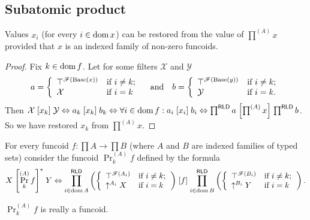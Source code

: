 \subsection{Subatomic product}
\begin{prop}
Values $x_{i}$ (for every $i\in\operatorname{dom} x$) can be restored from the
value of $\prod^{(A)}x$ provided that $x$ is an indexed family of
non-zero funcoids.\end{prop}
\begin{proof}
Fix $k\in\operatorname{dom} f$. Let for some filters $\mathcal{X}$ and $\mathcal{Y}$ 
\[
a=\left\{ \begin{array}{ll}
\top^{\mathscr{F}(\operatorname{Base}(x))} & \text{if }i\neq k;\\
\mathcal{X} & \text{if }i=k
\end{array}\right.\quad\text{and}\quad b=\left\{ \begin{array}{ll}
\top^{\mathscr{F}(\operatorname{Base}(y))} & \text{if }i\neq k;\\
\mathcal{Y} & \text{if }i=k.
\end{array}\right.
\]
Then $\mathcal{X}\mathrel{\left[x_{k}\right]}\mathcal{Y}\Leftrightarrow a_{k}\mathrel{\left[x_{k}\right]}b_{k}\Leftrightarrow\forall i\in\operatorname{dom} f:a_{i}\mathrel{\left[x_{i}\right]}b_{i}\Leftrightarrow\prod^{\mathsf{RLD}}a\mathrel{\left[\prod^{(A)}x\right]}\prod^{\mathsf{RLD}}b$.
So we have restored $x_{k}$ from $\prod^{(A)}x$.\end{proof}
\begin{defn}
For every funcoid $f:\prod A\rightarrow\prod B$ (where $A$ and $B$
are indexed families of typed sets) consider the funcoid $\Pr_{k}^{(A)}f$
defined by the formula 
\[
X\mathrel{\left[\Pr_{k}^{(A)}f\right]^{\ast}}Y\Leftrightarrow\prod_{i\in\operatorname{dom} A}^{\mathsf{RLD}}\left(\left\{ \begin{array}{ll}
\top^{\mathscr{F}(A_{i})} & \text{if }i\neq k;\\
\uparrow^{A_{i}}X & \text{if }i=k
\end{array}\right.\right)\mathrel{\left[f\right]}\prod_{i\in\operatorname{dom} B}^{\mathsf{RLD}}\left(\left\{ \begin{array}{ll}
\top^{\mathscr{F}(B_{i})} & \text{if }i\neq k;\\
\uparrow^{B_{i}}Y & \text{if }i=k
\end{array}\right.\right).
\]
\end{defn}
\begin{prop}
$\Pr_{k}^{(A)}f$ is really a funcoid.\end{prop}
